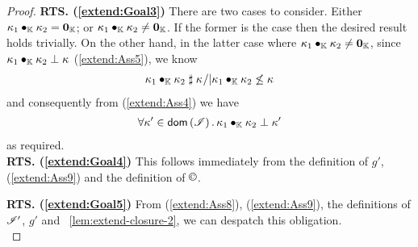 \begin{lemma}
\begin{proof}
\noindent\textbf{RTS. (\ref{extend:Goal3})}
There are two cases to consider. Either $\kappa_{1} \bullet_{\mathbb{K}} \kappa_{2} = \mathbf{0}_{\mathbb{K}}$;  or $\kappa_{1} \bullet_{\mathbb{K}} \kappa_{2} \not= \mathbf{0}_{\mathbb{K}}$. If the former is the case then the desired result holds trivially. On the other hand, in the latter case where $\kappa_{1} \bullet_{\mathbb{K}} \kappa_{2} \not= \mathbf{0}_{\mathbb{K}}$, since $\kappa_{1} \bullet_{\mathbb{K}} \kappa_{2} \mathrel{\bot} \kappa_{}$ (\ref{extend:Ass5}), we know 
%
\begin{align*}
	\kappa_{1} \bullet_{\mathbb{K}} \kappa_{2} \mathrel{\sharp} \kappa_{} /| \kappa_{1} \bullet_{\mathbb{K}} \kappa_{2} \not\leq \kappa_{} 
\end{align*}
% 
and consequently from (\ref{extend:Ass4}) we have
%
\begin{align*}
	\forall \kappa_{}' \in \textsf{dom}\left( \mathscr{I} \right).\, \kappa_{1} \bullet_{\mathbb{K}} \kappa_{2} \mathrel{\bot} \kappa_{}'
\end{align*}
%
as required. \\

\noindent\textbf{RTS. (\ref{extend:Goal4})}
This follows immediately from the definition of $g'$, (\ref{extend:Ass9}) and the definition of $\containI$.

\noindent\textbf{RTS. (\ref{extend:Goal5})}
From (\ref{extend:Ass8}), (\ref{extend:Ass9}), the definitions of $\mathscr{I}'$, $g'$ and \lem~\ref{lem:extend-closure-2}, we can despatch this obligation.\\


\end{proof}
\end{lemma}
